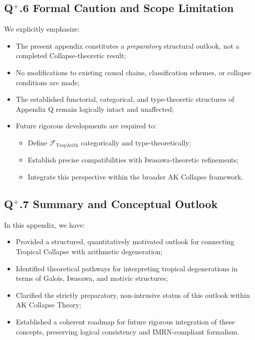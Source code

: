 \documentclass[11pt]{article}
\begin{document}
\subsection*{Q$^{+}$.6 Formal Caution and Scope Limitation}

We explicitly emphasize:

\begin{itemize}
    \item The present appendix constitutes a \emph{preparatory} structural outlook, not a completed Collapse-theoretic result;
    \item No modifications to existing causal chains, classification schemes, or collapse conditions are made;
    \item The established functorial, categorical, and type-theoretic structures of Appendix Q remain logically intact and unaffected;
    \item Future rigorous developments are required to:
    \begin{itemize}
        \item Define $\mathcal{F}_{\mathrm{TropArith}}$ categorically and type-theoretically;
        \item Establish precise compatibilities with Iwasawa-theoretic refinements;
        \item Integrate this perspective within the broader AK Collapse framework.
    \end{itemize}
\end{itemize}

\subsection*{Q$^{+}$.7 Summary and Conceptual Outlook}

In this appendix, we have:

\begin{itemize}
    \item Provided a structured, quantitatively motivated outlook for connecting Tropical Collapse with arithmetic degeneration;
    \item Identified theoretical pathways for interpreting tropical degenerations in terms of Galois, Iwasawa, and motivic structures;
    \item Clarified the strictly preparatory, non-intrusive status of this outlook within AK Collapse Theory;
    \item Established a coherent roadmap for future rigorous integration of these concepts, preserving logical consistency and IMRN-compliant formalism.
\end{itemize}
\end{document}
